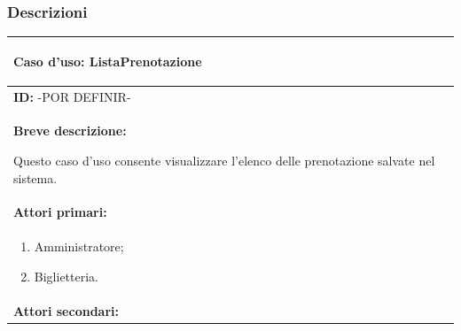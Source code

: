 \documentclass{article}
\begin{document}
            \subsubsection{Descrizioni}
                \begin{table}[t]
                    \centering
                    \begin{tabular}{|p{\linewidth}|}
                        \hline
                        \cellcolor{gray!100}
                        \color{white}
                        \begin{center}
                            \textbf{Caso d'uso:} ListaPrenotazione
                        \end{center} \\
                        \hline
                        \textbf{ID:} -POR DEFINIR- \\
                        \hline
                        \cellcolor{gray!20}
                        \textbf{Breve descrizione:}
                        
                        Questo caso d'uso consente visualizzare l'elenco delle prenotazione salvate nel sistema. \\
                        \hline
                        \textbf{Attori primari:} \\
                        \begin{minipage}{\linewidth}
                            \begin{enumerate}[noitemsep]
                                \item Amministratore;
                                \item Biglietteria.
                            \end{enumerate}
                        \end{minipage}
                        \vspace {-5pt} \\
                        \hline
                        \textbf{Attori secondari:}
                        

\end{tabular}
\end{table}
\end{document}
